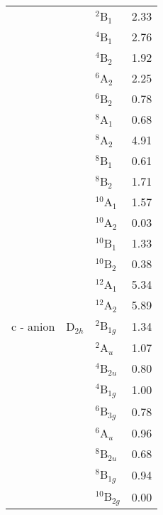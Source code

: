 \begin{center}
\begin{longtable}{llll}
                &          & $^2$B$_1$       & 2.33                 \\
                &          & $^4$B$_1$       & 2.76                 \\
                &          & $^4$B$_2$       & 1.92                 \\
                &          & $^6$A$_2$       & 2.25                 \\
                &          & $^6$B$_2$       & 0.78                 \\
                &          & $^8$A$_1$       & 0.68                 \\
                &          & $^8$A$_2$       & 4.91                 \\
                &          & $^8$B$_1$       & 0.61                 \\
                &          & $^8$B$_2$       & 1.71                 \\
                &          & $^{10}$A$_1$    & 1.57                 \\
                &          & $^{10}$A$_2$    & 0.03                 \\
                &          & $^{10}$B$_1$    & 1.33                 \\
                &          & $^{10}$B$_2$    & 0.38                 \\
                &          & $^{12}$A$_1$    & 5.34                 \\
                &          & $^{12}$A$_2$    & 5.89                 \\ \midrule
    c - anion   & D$_{2h}$ & $^2$B$_{1g}$    & 1.34                 \\
                &          & $^2$A$_u$       & 1.07                 \\
                &          & $^4$B$_{2u}$    & 0.80                 \\
                &          & $^4$B$_{1g}$    & 1.00                 \\
                &          & $^6$B$_{3g}$    & 0.78                 \\
                &          & $^6$A$_u$       & 0.96                 \\
                &          & $^8$B$_{2u}$    & 0.68                 \\
                &          & $^8$B$_{1g}$    & 0.94                 \\
                &          & $^{10}$B$_{2g}$ & 0.00                 \\

\end{longtable}
\end{center}
